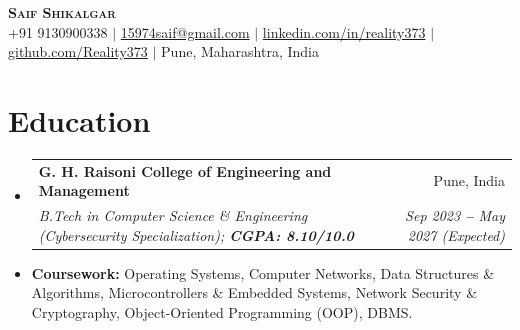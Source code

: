 \documentclass[letterpaper,9pt]{extarticle}
\makeatletter
\newcommand{\resumeSubheading}[4]{
  \vspace{-2pt}\item
    \begin{tabular*}{\linewidth}[t]{l@{\extracolsep{\fill}}r}
      \textbf{#1} & #2 \\
      \textit{\small#3} & \textit{\small #4} \\
    \end{tabular*}\vspace{-5pt}
}
\newcommand{\resumeSubHeadingListStart}{\begin{itemize}[leftmargin=0.08in, label={}]}
\newcommand{\resumeSubHeadingListEnd}{\end{itemize}\vspace{-5pt}}
\makeatother
\begin{document}

\begin{center}
    \textbf{\LARGE \scshape Saif Shikalgar} \\ \vspace{2pt}
    \small
    +91 9130900338
    $|$
    \href{mailto:15974saif@gmail.com}{15974saif@gmail.com}
    $|$
    \href{https://www.linkedin.com/in/reality373}{linkedin.com/in/reality373}
    $|$
    \href{https://github.com/Reality373}{github.com/Reality373}
    $|$
    Pune, Maharashtra, India
\end{center}
\vspace{-6pt}


\section{Education}
  \vspace{1pt}
  \resumeSubHeadingListStart
    \resumeSubheading
      {G. H. Raisoni College of Engineering and Management}{Pune, India}
      {B.Tech in Computer Science \& Engineering (Cybersecurity Specialization); \textbf{CGPA: 8.10/10.0}}{Sep 2023 \textbf{--} May 2027 (Expected)}
      \vspace{-2pt}
      \item{
        \small{\textbf{Coursework:} Operating Systems, Computer Networks, Data Structures \& Algorithms, Microcontrollers \& Embedded Systems, Network Security \& Cryptography, Object-Oriented Programming (OOP), DBMS.}
      }
  \resumeSubHeadingListEnd

\end{document}
